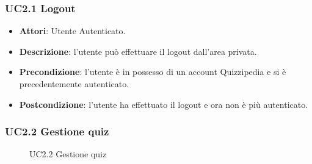 \subsubsection{UC2.1 Logout}
\begin{itemize}
\item \textbf{Attori}: Utente Autenticato.
\item \textbf{Descrizione}: l’utente può effettuare il logout dall’area privata.
\item \textbf{Precondizione}: l’utente è in possesso di un account Quizzipedia e si è precedentemente autenticato.
\item \textbf{Postcondizione}: l’utente ha effettuato il logout e ora non è più autenticato.
\end{itemize}
\subsubsection{UC2.2 Gestione quiz}
\begin{figure}[H]
\centering
\noindent{}
\caption{UC2.2 Gestione quiz}
\end{figure}
